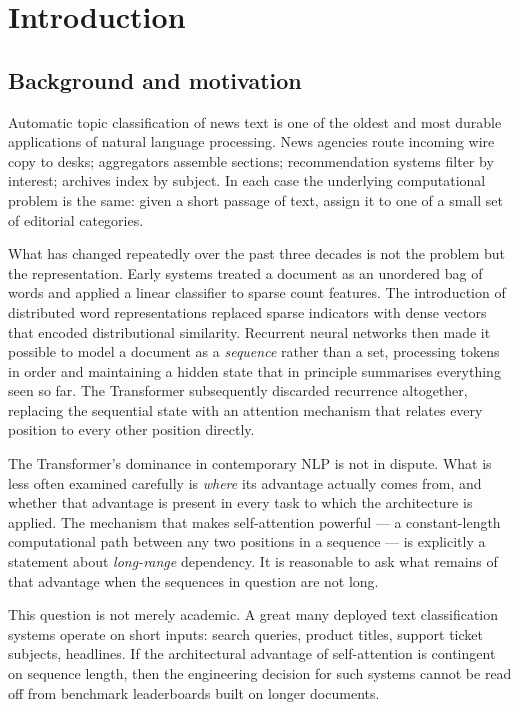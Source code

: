 \chapter{Introduction}
\label{ch:intro}

\section{Background and motivation}

Automatic topic classification of news text is one of the oldest and most durable applications of
natural language processing. News agencies route incoming wire copy to desks; aggregators assemble
sections; recommendation systems filter by interest; archives index by subject. In each case the
underlying computational problem is the same: given a short passage of text, assign it to one of a
small set of editorial categories.

What has changed repeatedly over the past three decades is not the problem but the representation.
Early systems treated a document as an unordered bag of words and applied a linear classifier to
sparse count features. The introduction of distributed word representations replaced sparse
indicators with dense vectors that encoded distributional similarity. Recurrent neural networks
then made it possible to model a document as a \emph{sequence} rather than a set, processing tokens
in order and maintaining a hidden state that in principle summarises everything seen so far. The
Transformer subsequently discarded recurrence altogether, replacing the sequential state with an
attention mechanism that relates every position to every other position directly.

The Transformer's dominance in contemporary NLP is not in dispute. What is less often examined
carefully is \emph{where} its advantage actually comes from, and whether that advantage is present
in every task to which the architecture is applied. The mechanism that makes self-attention
powerful --- a constant-length computational path between any two positions in a sequence --- is
explicitly a statement about \emph{long-range} dependency. It is reasonable to ask what remains of
that advantage when the sequences in question are not long.

This question is not merely academic. A great many deployed text classification systems operate on
short inputs: search queries, product titles, support ticket subjects, headlines. If the
architectural advantage of self-attention is contingent on sequence length, then the
engineering decision for such systems cannot be read off from benchmark leaderboards built on
longer documents.

